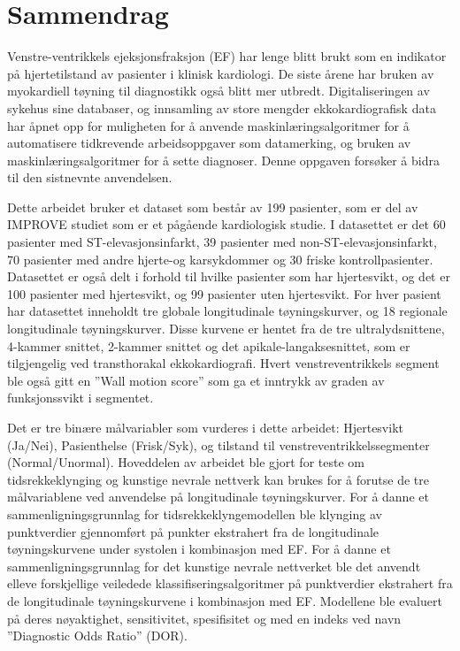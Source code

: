 \section*{Sammendrag}
%

Venstre-ventrikkels ejeksjonsfraksjon (EF) har lenge blitt brukt som en indikator på hjertetilstand av pasienter i klinisk kardiologi. De siste årene har bruken av myokardiell tøyning til diagnostikk også blitt mer utbredt. Digitaliseringen av sykehus sine databaser, og innsamling av store mengder ekkokardiografisk data har åpnet opp for muligheten for å anvende maskinlæringsalgoritmer for å automatisere tidkrevende arbeidsoppgaver som datamerking, og bruken av maskinlæringsalgoritmer for å sette diagnoser. Denne oppgaven forsøker å bidra til den sistnevnte anvendelsen. \bigskip

Dette arbeidet bruker et dataset som består av 199 pasienter, som er del av IMPROVE studiet som er et pågående kardiologisk studie. I datasettet er det 60 pasienter med ST-elevasjonsinfarkt, 39 pasienter med non-ST-elevasjonsinfarkt, 70 pasienter med andre hjerte-og karsykdommer og 30 friske kontrollpasienter. Datasettet er også delt i forhold til hvilke pasienter som har hjertesvikt, og det er 100 pasienter med hjertesvikt, og 99 pasienter uten hjertesvikt. For hver pasient har datasettet inneholdt tre globale longitudinale tøyningskurver, og 18 regionale longitudinale tøyningskurver. Disse kurvene er hentet fra de tre ultralydsnittene, 4-kammer snittet, 2-kammer snittet og det apikale-langaksesnittet, som er tilgjengelig ved  transthorakal ekkokardiografi. Hvert venstreventrikkels segment ble også gitt en ''Wall motion score'' som ga et inntrykk av graden av funksjonssvikt i segmentet. \bigskip

Det er tre binære målvariabler som vurderes i dette arbeidet: Hjertesvikt (Ja/Nei), Pasienthelse (Frisk/Syk), og tilstand til venstreventrikkelssegmenter (Normal/Unormal). Hoveddelen av arbeidet ble gjort for teste om tidsrekkeklynging og kunstige nevrale nettverk kan brukes for å forutse de tre målvariablene ved anvendelse på longitudinale tøyningskurver. For å danne et sammenligningsgrunnlag for tidsrekkeklyngemodellen ble klynging av punktverdier gjennomført på punkter ekstrahert fra de longitudinale tøyningskurvene under systolen i kombinasjon med EF. For å danne et sammenligningsgrunnlag for det kunstige nevrale nettverket ble det anvendt elleve forskjellige veiledede klassifiseringsalgoritmer på punktverdier ekstrahert fra de longitudinale tøyningskurvene i kombinasjon med EF. Modellene ble evaluert på deres nøyaktighet, sensitivitet, spesifisitet og med en indeks ved navn ''Diagnostic Odds Ratio'' (DOR). \bigskip


